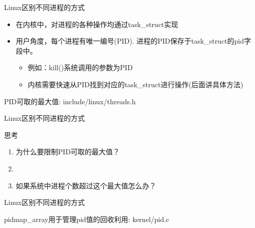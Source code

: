 \documentclass[xcolor=svgnames]{beamer}
\begin{document}
\begin{CJK*}{UTF8}{gbsn}
\begin{frame}{Linux区别不同进程的方式}
\begin{itemize}
\item 在内核中，对进程的各种操作均通过task\_struct实现
\item 用户角度，每个进程有唯一编号(PID). 进程的PID保存于task\_struct的pid字段中。
\begin{itemize}
\item 例如：kill()系统调用的参数为PID
\item 内核需要快速从PID找到对应的task\_struct进行操作(后面讲具体方法)
\end{itemize}
\end{itemize}
\begin{block}{PID可取的最大值: include/linux/threads.h}
\lstpidmax
\end{block}
\end{frame}

\begin{frame}{Linux区别不同进程的方式}
\begin{block}{思考}
\begin{enumerate}
\item 为什么要限制PID可取的最大值？
\item[]
\item 如果系统中进程个数超过这个最大值怎么办？
\end{enumerate}
\end{block}
\end{frame}

\begin{frame}{Linux区别不同进程的方式}
\begin{block}{pidmap\_array用于管理pid值的回收利用: kernel/pid.c}
\lstpidmaparray
\end{block}
\end{frame}


\end{CJK*}
\end{document}
